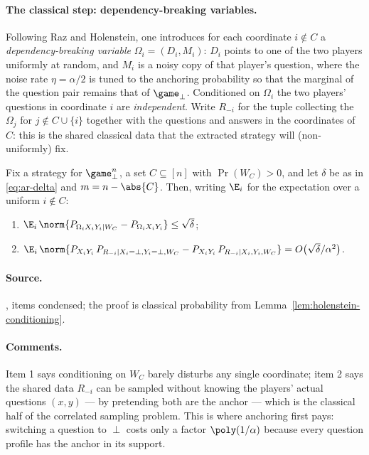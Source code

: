 \paragraph{The classical step: dependency-breaking variables.} Following Raz and
Holenstein, one introduces for each coordinate $i \notin C$ a \emph{dependency-breaking
variable} $\Omega_i = (D_i, M_i)$: $D_i$ points to one of the two players uniformly at
random, and $M_i$ is a noisy copy of that player's question, where the noise rate
$\eta = \alpha/2$ is tuned to the anchoring probability so that the marginal of the
question pair remains that of $\game_\perp$. Conditioned on $\Omega_i$ the two
players' questions in coordinate $i$ are \emph{independent}. Write $R_{-i}$ for the
tuple collecting the $\Omega_j$ for $j \notin C \cup \{i\}$ together with the
questions and answers in the coordinates of $C$: this is the shared classical data
that the extracted strategy will (non-uniformly) fix.

\effortMedium

\begin{lemma}
\label{lem:dependency-breaking}
Fix a strategy for $\game_\perp^{n}$, a set $C \subseteq [n]$ with $\Pr(W_C) > 0$, and
let $\delta$ be as in \eqref{eq:ar-delta} and $m = n - \abs{C}$. Then, writing
$\E_{i}$ for the expectation over a uniform $i \notin C$:
\begin{enumerate}
\item $\E_{i} \, \norm{ P_{\Omega_i X_i Y_i | W_C} - P_{\Omega_i X_i Y_i} } \leq
  \sqrt{\delta}$;
\item $\E_{i} \, \norm{ P_{X_i Y_i}\, P_{R_{-i} | X_i = \perp, Y_i = \perp, W_C} -
  P_{X_i Y_i}\, P_{R_{-i} | X_i, Y_i, W_C} } = O\bigl( \sqrt{\delta} / \alpha^2
  \bigr)$.
\end{enumerate}
\end{lemma}

\paragraph{Source.} \cite[Lemma 4.6]{BVY17}, items condensed; the proof is classical
probability from Lemma~\ref{lem:holenstein-conditioning}.

\paragraph{Comments.} Item 1 says conditioning on $W_C$ barely disturbs any single
coordinate; item 2 says the shared data $R_{-i}$ can be sampled without knowing the
players' actual questions $(x, y)$ --- by pretending both are the anchor --- which is
the classical half of the correlated sampling problem. This is where anchoring first
pays: switching a question to $\perp$ costs only a factor $\poly(1/\alpha)$ because
every question profile has the anchor in its support.

